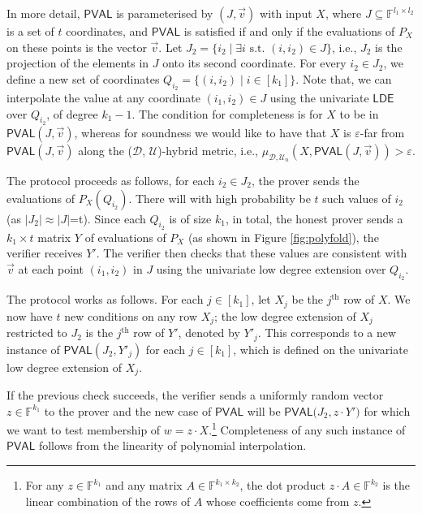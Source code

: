 \documentclass[10pt,a4paper]{article}
\newcommand{\PVAL}{\mathsf{PVAL}}
\newcommand{\LDE}{\mathsf{LDE}}
\begin{document}
In more detail, $\PVAL$ is parameterised by $(J,\vec{v})$ with input $X$, where $J\subseteq \mathbb{F}^{l_{1}\times l_{2}}$ is a set of $t$ coordinates, and $\PVAL$ is satisfied if and only if the evaluations of $P_X$ on these points is the vector $\vec{v}$. Let $J_{2}=\{i_{2} \mid \exists i \text{ s.t. } (i,i_{2})\in J\}$, i.e., $J_2$ is the projection of the elements in $J$ onto its second coordinate. For every $i_{2}\in J_{2}$, we define a new set of coordinates $Q_{i_{2}}=\{(i,i_{2}) \mid i\in [k_{1}]\}$. Note that, we can interpolate the value at any coordinate $(i_{1},i_{2}) \in J$ using the univariate $\LDE$ over $Q_{i_2}$, of degree $k_1-1$. The condition for completeness is for $X$ to be in $\PVAL(J,\vec{v})$, whereas for soundness we would like to have that $X$ is $\varepsilon$-far from $\PVAL(J,\vec{v})$ along the ($\mathcal{D}$, $\mathcal{U}$)-hybrid metric, i.e., $\mu_{\mathcal{D}, \mathcal{U}_{n}}(X,\PVAL(J,\vec{v}))>\varepsilon$. 

The protocol proceeds as follows, for each $i_{2}\in J_{2}$, the prover sends the evaluations of $P_{X}(Q_{i_{2}})$. There will with high probability be $t$ such values of $i_{2}$ (as $\vert J_{2}\vert\approx\vert J \vert$=t). Since each $Q_{i_{2}}$ is of size $k_{1}$, in total, the honest prover sends a $k_1 \times t$ matrix $Y$ of evaluations of $P_X$ (as shown in Figure \ref{fig:polyfold}), the verifier receives $Y'$. The verifier then checks that these values are consistent with $\vec{v}$ at each point $(i_{1},i_{2})$ in $J$ using the univariate low degree extension over $Q_{i_2}$. 

The \cite{RVW} protocol works as follows. For each $j\in [k_{1}]$, let $X_{j}$ be the $j^{\text{th}}$ row of $X$. We now have $t$ new conditions on any row $X_j$; the low degree extension of $X_{j}$ restricted to $J_{2}$ is the $j^{\text{th}}$ row of $Y'$, denoted by $Y'_j$. This corresponds to a new instance of $\PVAL(J_{2},Y'_j)$ for each $j \in [k_1]$, which is defined on the univariate low degree extension of $X_{j}$. 

If the previous check succeeds, the verifier sends a uniformly random vector $z\in \mathbb{F}^{k_{1}}$ to the prover and the new case of $\PVAL$ will be $\PVAL\bigg(J_{2}, z \cdot Y'\bigg)$ for which we want to test membership of $w = z\cdot X$.\footnote{For any $z \in \mathbb{F}^{k_1}$ and any matrix $A \in \mathbb{F}^{k_1 \times k_2}$, the dot product $z \cdot A \in \mathbb{F}^{k_2}$ is the linear combination of the rows of $A$ whose coefficients come from $z$.} Completeness of any such instance of $\PVAL$ follows from the linearity of polynomial interpolation. 
\end{document}
